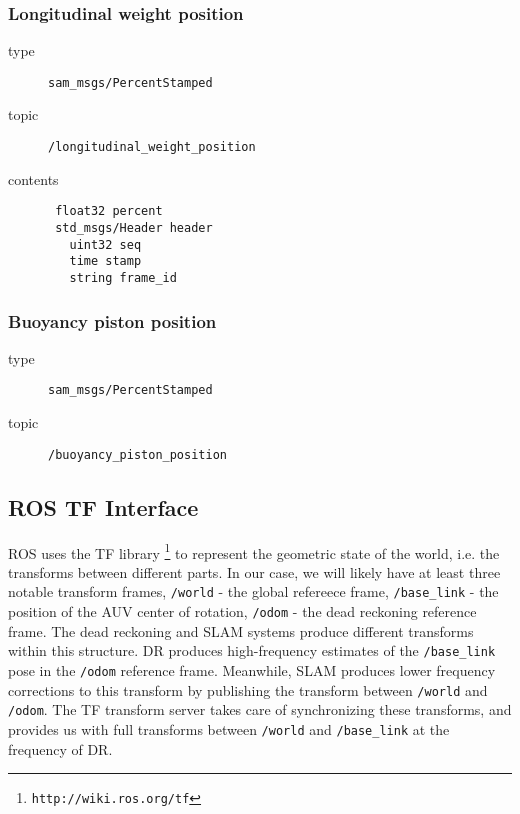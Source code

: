 \documentclass[9pt,technote]{IEEEtran} %
\begin{document}
\subsubsection{Longitudinal weight position} 

\begin{description}
\item[type] \texttt{sam\_msgs/PercentStamped}
\item[topic] \texttt{/longitudinal\_weight\_position}
\item[contents] \begin{scriptsize}
\begin{verbatim}
 float32 percent
 std_msgs/Header header
   uint32 seq
   time stamp
   string frame_id
\end{verbatim}
\end{scriptsize}
\end{description}

\subsubsection{Buoyancy piston position}

\begin{description}
\item[type] \texttt{sam\_msgs/PercentStamped}
\item[topic] \texttt{/buoyancy\_piston\_position}
\end{description}

\subsection{ROS TF Interface}
\label{tf}

ROS uses the TF library \footnote{\texttt{http://wiki.ros.org/tf}} to represent
the geometric state of the world, i.e. the transforms between different parts.
In our case, we will likely have at least three notable transform frames,
\texttt{/world} - the global refereece frame,
\texttt{/base\_link} - the position of the AUV center of rotation,
\texttt{/odom} - the dead reckoning reference frame.
The dead reckoning and SLAM systems produce different transforms within
this structure. DR produces high-frequency estimates of the \texttt{/base\_link}
pose in the \texttt{/odom} reference frame. Meanwhile, SLAM produces lower
frequency corrections to this transform by publishing the transform
between \texttt{/world} and \texttt{/odom}. The TF transform server takes
care of synchronizing these transforms, and provides us with
full transforms between \texttt{/world} and \texttt{/base\_link}
at the frequency of DR.
\end{document}
